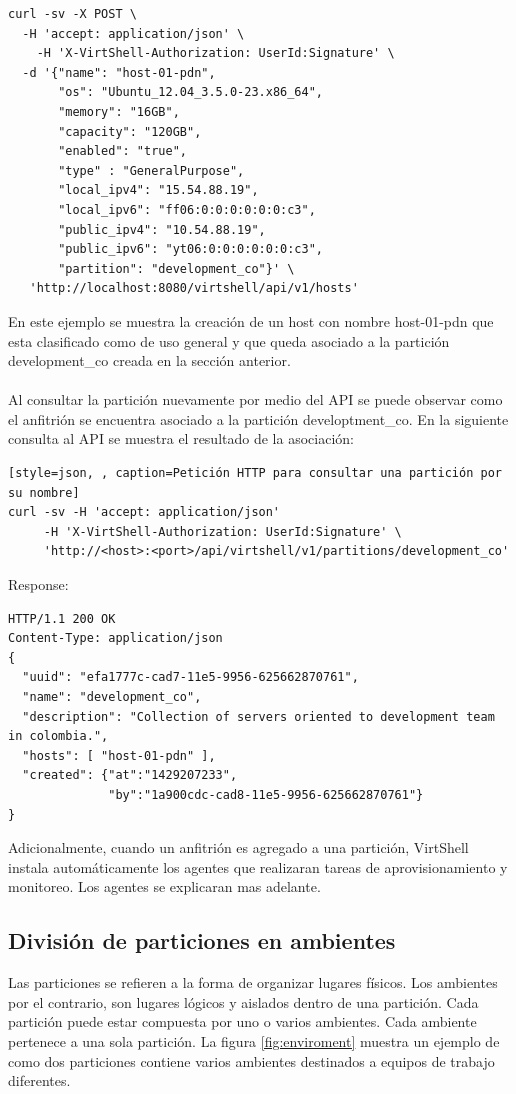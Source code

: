 \begin{lstlisting}[style=json, caption=Petición HTTP para crear un host]
curl -sv -X POST \
  -H 'accept: application/json' \
    -H 'X-VirtShell-Authorization: UserId:Signature' \
  -d '{"name": "host-01-pdn",
       "os": "Ubuntu_12.04_3.5.0-23.x86_64",
       "memory": "16GB",
       "capacity": "120GB",
       "enabled": "true",
       "type" : "GeneralPurpose",
       "local_ipv4": "15.54.88.19",
       "local_ipv6": "ff06:0:0:0:0:0:0:c3",
       "public_ipv4": "10.54.88.19",
       "public_ipv6": "yt06:0:0:0:0:0:0:c3",
       "partition": "development_co"}' \
   'http://localhost:8080/virtshell/api/v1/hosts'
\end{lstlisting}

En este ejemplo se muestra la creación de un host con nombre host-01-pdn que esta clasificado como de uso general y que queda asociado a la partición development\_co creada en la sección anterior.\\
\\
Al consultar la partición nuevamente por medio del API se puede observar como el anfitrión se encuentra asociado a la partición developtment\_co. En la siguiente consulta al API se muestra el resultado de la asociación: 

\begin{lstlisting}[style=json, , caption=Petición HTTP para consultar una partición por su nombre]
curl -sv -H 'accept: application/json' 
     -H 'X-VirtShell-Authorization: UserId:Signature' \ 
     'http://<host>:<port>/api/virtshell/v1/partitions/development_co'
\end{lstlisting}

Response:

\begin{lstlisting}[style=json]
HTTP/1.1 200 OK
Content-Type: application/json
{
  "uuid": "efa1777c-cad7-11e5-9956-625662870761",
  "name": "development_co",
  "description": "Collection of servers oriented to development team in colombia.", 
  "hosts": [ "host-01-pdn" ],  
  "created": {"at":"1429207233", 
              "by":"1a900cdc-cad8-11e5-9956-625662870761"}
}
\end{lstlisting}

Adicionalmente, cuando un anfitrión es agregado a una partición, VirtShell instala automáticamente los agentes  que realizaran tareas de aprovisionamiento y monitoreo. Los agentes se explicaran mas adelante.

\subsection{División de particiones en ambientes}
Las particiones se refieren a la forma de organizar lugares físicos. Los ambientes por el contrario, son lugares lógicos y aislados dentro de una partición. Cada partición puede estar compuesta por uno o varios ambientes. Cada ambiente pertenece a una sola partición. La figura \ref{fig:enviroment} muestra un ejemplo de como dos particiones contiene varios ambientes destinados a equipos de trabajo diferentes. \\

